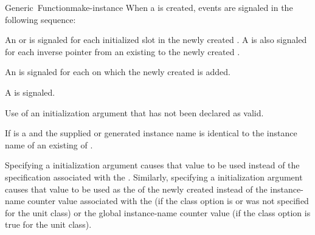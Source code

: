 \documentclass[10pt,twoside,english,pdftex]{article}
\begin{document}
\begin{functiondoc}{Generic~Function}{make-instance}{
     
    }
\fnevents
{}%
%
%
%
%
%
%
%
%
%
%
%
When a  is created, events are signaled in the
following sequence: 
\begin{tightenumerate}
\item An  or 
  is signaled for each initialized slot in the newly created
  .  A  is also signaled for each
  inverse pointer from an existing  to the newly created
  .
\item An  is signaled
  for each  on which the newly created
   is added.
\item A  is signaled.
\end{tightenumerate}

\fnerrors
Use of an initialization argument that has not been declared as valid.

If  is a  and the supplied or generated
instance name is identical to the instance name of an existing
 of .

%
%
%
%
%
\fndescription 
%
Specifying a  initialization argument causes
that value to be used instead of the 
specification associated with the . Similarly, specifying a
 initialization argument causes that value to be
used as the  of the newly created 
instead of the instance-name counter value associated with the
 (if the 
class option is \nil{} or was not specified for the unit class) or the global
instance-name counter value (if the
 class option is true for the
unit class).


\end{functiondoc}
\end{document}
